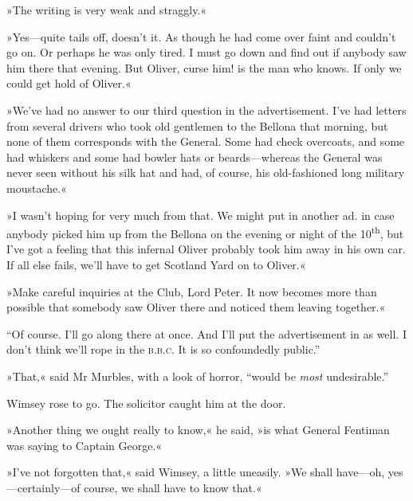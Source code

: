 »The writing is very weak and straggly.«

»Yes—quite tails off, doesn't it. As though he had come over faint and couldn't go on. Or perhaps he was only tired. I must go down and find out if anybody saw him there that evening. But Oliver, curse him! is the man who knows. If only we could get hold of Oliver.«

»We've had no answer to our third question in the advertisement. I've had letters from several drivers who took old gentlemen to the Bellona that morning, but none of them corresponds with the General. Some had check overcoats, and some had whiskers and some had bowler hats or beards—whereas the General was never seen without his silk hat and had, of course, his old-fashioned long military moustache.«

»I wasn't hoping for very much from that. We might put in another ad. in case anybody picked him up from the Bellona on the evening or night of the  10\textsuperscript{th}, but I've got a feeling that this infernal Oliver probably took him away in his own car. If all else fails, we'll have to get Scotland Yard on to Oliver.«

»Make careful inquiries at the Club, Lord Peter. It now becomes more than possible that somebody saw Oliver there and noticed them leaving together.«

\enquote{Of course. I'll go along there at once. And I'll put the advertisement in as well. I don't think we'll rope in the \textsc{b.b.c.} It is so confoundedly public.}

»That,« said Mr Murbles, with a look of horror, \enquote{would be \textit{most} undesirable.}

Wimsey rose to go. The solicitor caught him at the door.

»Another thing we ought really to know,« he said, »is what General Fentiman was saying to Captain George.«

»I've not forgotten that,« said Wimsey, a little uneasily. »We shall have—oh, yes—certainly—of course, we shall have to know that.«
